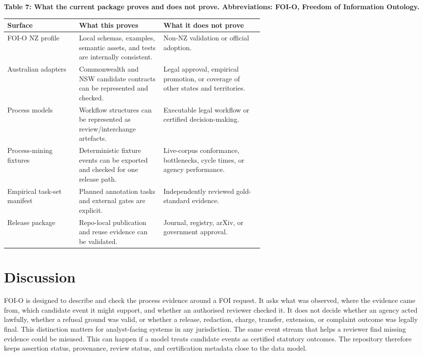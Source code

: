 \documentclass[
]{article}
\begin{document}
\begin{table}[htbp]
\small
\hypertarget{tab-evidence-boundaries}{}
\begin{center}\small\textbf{Table 7: What the current package proves and does not prove. Abbreviations: FOI-O, Freedom of Information Ontology.}\end{center}
\begin{tabularx}{\linewidth}{>{\raggedright\arraybackslash}p{0.28\linewidth}>{\raggedright\arraybackslash}p{0.33\linewidth}X}
\toprule
Surface & What this proves & What it does not prove \\
\midrule
FOI-O NZ profile & Local schemas, examples, semantic assets, and tests are internally consistent. & Non-NZ validation or official adoption. \\
Australian adapters & Commonwealth and NSW candidate contracts can be represented and checked. & Legal approval, empirical promotion, or coverage of other states and territories. \\
Process models & Workflow structures can be represented as review/interchange artefacts. & Executable legal workflow or certified decision-making. \\
Process-mining fixtures & Deterministic fixture events can be exported and checked for one release path. & Live-corpus conformance, bottlenecks, cycle times, or agency performance. \\
Empirical task-set manifest & Planned annotation tasks and external gates are explicit. & Independently reviewed gold-standard evidence. \\
Release package & Repo-local publication and reuse evidence can be validated. & Journal, registry, arXiv, or government approval. \\
\bottomrule
\end{tabularx}
\end{table}

\clearpage

\section{Discussion}\label{discussion}

FOI-O is designed to describe and check the process evidence around a
FOI request. It asks what was observed, where the evidence came from,
which candidate event it might support, and whether an authorised
reviewer checked it. It does not decide whether an agency acted
lawfully, whether a refusal ground was valid, or whether a release,
redaction, charge, transfer, extension, or complaint outcome was legally
final. This distinction matters for analyst-facing systems in any
jurisdiction. The same event stream that helps a reviewer find missing
evidence could be misused. This can happen if a model treats candidate
events as certified statutory outcomes. The repository therefore keeps
assertion status, provenance, review status, and certification metadata
close to the data model.
\end{document}
